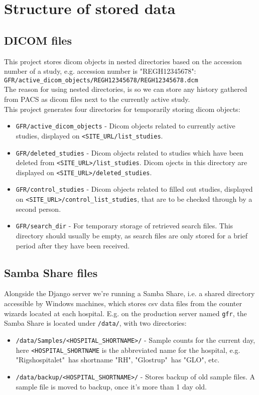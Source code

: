 \documentclass{article}
\begin{document}
\section{Structure of stored data}
\subsection{DICOM files}
This project stores dicom objects in nested directories based on the accession number of a study, e.g. accession number is "REGH12345678": \\ \texttt{GFR/active\_dicom\_objects/REGH12345678/REGH12345678.dcm} \\
The reason for using nested directories, is so we can store any history gathered from PACS as dicom files next to the currently active study. \\

This project generates four directories for temporarily storing dicom objects:
\begin{itemize}
	\item \texttt{GFR/active\_dicom\_objects} - Dicom objects related to currently active studies, displayed on \texttt{<SITE\_URL/list\_studies}.
	\item \texttt{GFR/deleted\_studies} - Dicom objects related to studies which have been deleted from \texttt{<SITE\_URL>/list\_studies}. Dicom ojects in this directory are displayed on \texttt{<SITE\_URL>/deleted\_studies}.
	\item \texttt{GFR/control\_studies} - Dicom objects related to filled out studies, displayed on \texttt{<SITE\_URL>/control\_list\_studies}, that are to be checked through by a second person.
	\item \texttt{GFR/search\_dir} - For temporary storage of retrieved search files. This directory should usually be empty, as search files are only stored for a brief period after they have been received.
\end{itemize}

\subsection{Samba Share files}
Alongside the Django server we're running a Samba Share, i.e. a shared directory accessible by Windows machines, which stores csv data files from the counter wizards located at each hospital. E.g. on the production server named \texttt{gfr}, the Samba Share is located under \texttt{/data/}, with two directories:
\begin{itemize}
	\item \texttt{/data/Samples/<HOSPITAL\_SHORTNAME>/} - Sample counts for the current day, here \texttt{<HOSPITAL\_SHORTNAME} is the abbreviated name for the hospital, e.g. "Rigshospitalet"\ has shortname "RH", "Glostrup"\ has "GLO", etc.
	\item \texttt{/data/backup/<HOSPITAL\_SHORTNAME>/} - Stores backup of old sample files. A sample file is moved to backup, once it's more than 1 day old.
\end{itemize}
\end{document}
